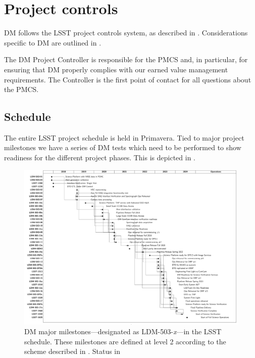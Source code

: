 \newpage
\section{Project controls}\label{sect:dmpc}

DM follows the LSST project controls system, as described in .
Considerations specific to DM are outlined in .

The DM Project Controller is responsible for the PMCS and, in particular, for ensuring that DM properly complies with our earned value management requirements.
The Controller is the first point of contact for all questions about the PMCS.

\subsection{Schedule}\label{sect:schedule}

The entire LSST project schedule is held in Primavera.
Tied to major project milestones we have a series of DM tests which need to be performed to show readiness for the different project phases.
This is depicted in .

\begin{figure}[htbp]
	\begin{center}
		 \includegraphics[width=\textwidth]{gantt}
		 \caption{DM major milestones---designated as LDM-503-\textit{x}---in
         the LSST schedule. These milestones are defined at level 2 according
         to the scheme described in . Status in }
         \label{fig:schedule}
	 \end{center}
 \end{figure}

